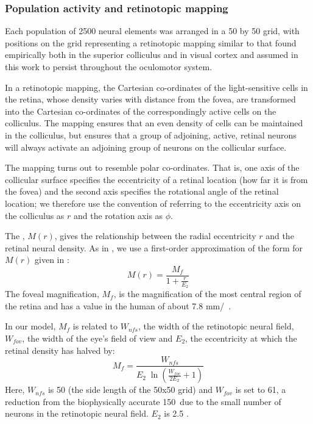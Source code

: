 \documentclass{frontiersSCNS}
\begin{document}
\subsubsection{Population activity and retinotopic mapping}

Each population of 2500 neural elements was arranged in a 50 by 50
grid, with positions on the grid representing a retinotopic
mapping similar to that found empirically both in the superior
colliculus \citep{ottes_visuomotor_1986} and in visual cortex
\citep{eric_l._schwartz_computational_1980} and assumed in
this work to persist throughout the oculomotor system.

In a retinotopic mapping, the Cartesian co-ordinates of the light-sensitive
cells in the retina, whose density varies with distance from the fovea,
are transformed into the Cartesian co-ordinates of
the correspondingly active cells on the colliculus. The mapping ensures
that an even density of cells can be maintained in the colliculus, but
ensures that a group of adjoining, active, retinal neurons will
always activate an adjoining group of neurons on the collicular
surface.

The mapping turns out to resemble polar co-ordinates. That is, one
axis of the collicular surface specifies the eccentricity of
a retinal location (how far it is from the fovea) and the second axis
specifies the rotational angle of the retinal location; we therefore
use the convention of referring to the eccentricity axis on the
colliculus as $r$ and the rotation axis as $\phi$.

The , $M(r)$, gives the relationship
between the
radial eccentricity $r$ and the retinal neural density. As in
\cite{cope_basal_2017}, we use a first-order approximation of the form
for $M(r)$ given in  \cite{rovamo_estimation_1979}:
\begin{equation} \label{eq:cmf}
M(r) = \frac{M_f}{1+\frac{r}{E_2}}
\end{equation}
The foveal magnification, $M_f$, is the magnification of the most central
region of the retina and has a value in the human of about
7.8 mm/\dg~\citep{rovamo_estimation_1979}.

In our model, $M_f$ is related to $W_{nfs}$, the width of the retinotopic neural
field, $W_{fov}$, the width of the eye's field of view and $E_2$, the
eccentricity at which the retinal density has halved by:
\begin{equation} \label{eq:fm}
   M_f = \frac {W_{nfs}} {E_2\;\ln\left(\frac{W_{fov}}{2 E_2} + 1\right)}
\end{equation}
Here, $W_{nfs}$ is 50 (the side length of the 50x50 grid)
and $W_{fov}$ is set to 61\dg, a
reduction from the biophysically accurate 150\dg~due to the small
number of neurons in the retinotopic neural field. $E_2$ is
2.5 \citep{cope_basal_2017,slotnick_electrophysiological_2001}.
\end{document}
